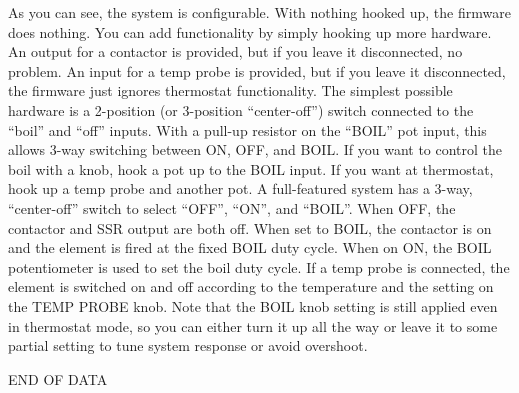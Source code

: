 \documentclass[dvips,12pt]{article}
\begin{document}
As you can see, the system is configurable. With nothing hooked up, the firmware does nothing. You can add
functionality by simply hooking up more hardware. An output for a contactor
is provided, but if you leave it disconnected, no problem. An input for a
temp probe is provided, but if you leave it disconnected, the firmware just
ignores thermostat functionality. The simplest possible
hardware is a 2-position (or 3-position ``center-off'') switch connected to
the ``boil'' and ``off'' inputs. With a pull-up resistor on the ``BOIL''
pot input, this allows 3-way switching between ON, OFF, and BOIL. If you
want to control the boil with a knob, hook a pot up to the BOIL input. If
you want at thermostat, hook up a temp probe and another pot. A
full-featured system has a 3-way, ``center-off'' switch to select ``OFF'',
``ON'', and ``BOIL''. When OFF, the contactor and SSR output are both off.
When set to BOIL, the contactor is on and the element is fired at the fixed
BOIL duty cycle. When on ON, the BOIL potentiometer is used to set the boil
duty cycle. If a temp probe is connected, the element is switched on and off according to the temperature and the setting on the TEMP PROBE knob. Note that the BOIL knob setting is still applied even in thermostat mode, so you can either turn it up all the way or leave it to some partial setting to tune system response or avoid overshoot.  

\centering
\vspace{2cm}
END OF DATA
\appendix
\end{document}
